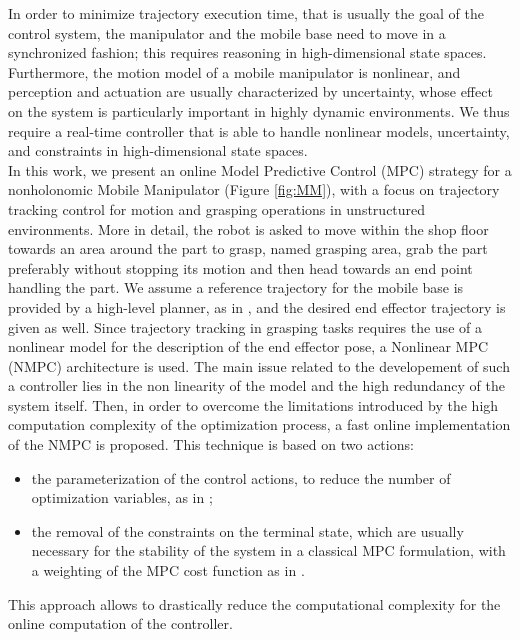 In order to minimize trajectory execution time, that is usually the goal of the control system, the manipulator and the mobile base need to move in a synchronized fashion; this requires reasoning in high-dimensional state spaces.
Furthermore, the motion model of a mobile manipulator is nonlinear, and perception and actuation are usually characterized by uncertainty, whose effect on the system is particularly important in highly dynamic environments.
We thus require a real-time controller that is able to handle nonlinear models, uncertainty, and constraints in high-dimensional state spaces.\\
In this work, we present an online Model Predictive Control (MPC) strategy for a nonholonomic Mobile Manipulator (Figure \ref{fig:MM}), with a focus on trajectory tracking control for motion and grasping operations in unstructured environments. More in detail, the robot is asked to move within the shop floor towards an area around the part to grasp, named grasping area, grab the part preferably without stopping its motion and then head towards an end point handling the part.
We assume a reference trajectory for the mobile base is provided by a high-level planner, as in \cite{thakar2018case,thakar2019icra,kabir2019icra,Rajendran2017}, and the desired end effector trajectory is given as well. Since trajectory tracking in grasping tasks requires the use of a nonlinear model for the description of the end effector pose, a Nonlinear MPC (NMPC) architecture is used. The main issue related to the developement of such a controller lies in the non linearity of the model and the high redundancy of the system itself. Then, in order to overcome the limitations introduced by the high computation complexity of the optimization process, a fast online implementation of the NMPC is proposed. This technique is based on two actions:
\begin{itemize}
	\item the parameterization of the control actions, to reduce the number of optimization variables, as in \cite{Howard2007};
	\item the removal of the constraints on the terminal state, which are usually necessary for the stability of the system in a classical MPC formulation, with a weighting of the MPC cost function as in \cite{alamir2018stability}. 
\end{itemize}
This approach allows to drastically reduce the computational complexity for the online computation of the controller. 
